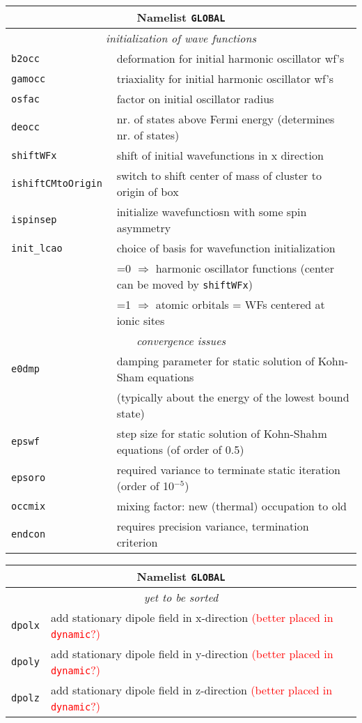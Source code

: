 \documentclass[12pt]{article}
\begin{document}
\begin{tabular}{ll}
\hline
\multicolumn{2}{c}{Namelist {\tt GLOBAL}} in {\tt for005.<name>} \\
\hline
\multicolumn{2}{c}{\it initialization of wave functions} \\
\hline
{\tt b2occ            }& deformation for initial harmonic oscillator wf's\\
{\tt gamocc           }& triaxiality for initial harmonic oscillator wf's\\
{\tt osfac} & factor on initial oscillator radius  \\
{\tt deocc            }& nr. of states above Fermi energy (determines nr. of
states)\\
{\tt shiftWFx         }& shift of initial wavefunctions in x direction \\
{\tt ishiftCMtoOrigin }& switch to shift center of mass of cluster to
origin of box\\
{\tt ispinsep         }& initialize wavefunctiosn with some spin asymmetry\\
{\tt init\_lcao       }& choice of basis for wavefunction initialization \\
& =0 $\Longrightarrow$ harmonic oscillator functions (center can be
moved
  by {\tt shiftWFx})
\\
& =1 $\Longrightarrow$ atomic orbitals = WFs centered at ionic sites
\\
\hline
\multicolumn{2}{c}{\it convergence issues} \\
\hline
{\tt e0dmp            }& damping parameter for static solution of Kohn-Sham equations\\
& (typically about the energy of the lowest bound state)\\
{\tt epswf            }& step size for static solution of Kohn-Shahm
equations (of order of 0.5)\\
{\tt epsoro           }& required variance to terminate static iteration (order of 10$^{-5}$)\\
{\tt occmix} &  mixing factor: new (thermal) occupation to old \\
{\tt endcon} &  requires precision variance, termination criterion \\
\hline
\end{tabular}

\begin{tabular}{ll}
\hline
\multicolumn{2}{c}{Namelist {\tt GLOBAL}} in {\tt for005.<name>} \\
\hline
\multicolumn{2}{c}{\it yet to be sorted} \\
\hline
{\tt dpolx} & add stationary dipole field in x-direction
\textcolor{red}{(better placed in {\tt dynamic}?)}\\
{\tt dpoly} & add stationary dipole field in y-direction  \textcolor{red}{(better placed in {\tt dynamic}?)}  \\
{\tt dpolz} & add stationary dipole field in z-direction  \textcolor{red}{(better placed in {\tt dynamic}?)}  \\
\hline
\end{tabular}
\end{document}
